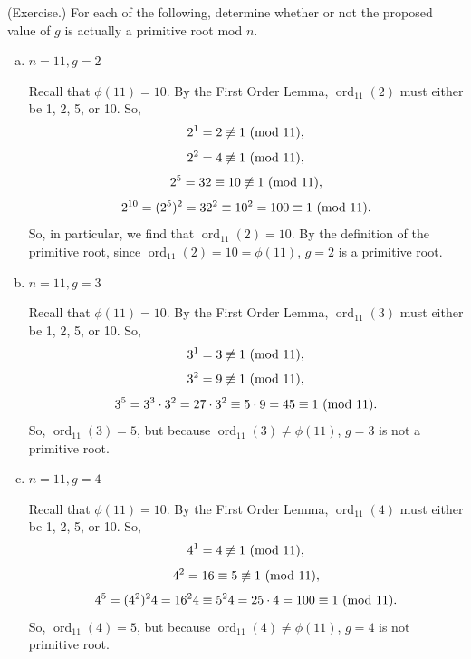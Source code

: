 \documentclass[letterpaper]{article}
\DeclareMathOperator{\ord}{ord}
\begin{document}
\begin{mdframed}
    (Exercise.) For each of the following, determine whether or not the proposed value of $g$ is actually a primitive root mod $n$. 
    \begin{enumerate}[(a)]
        \item $n = 11, g = 2$
        \begin{mdframed}
            Recall that $\phi(11) = 10$. By the First Order Lemma, $\ord_{11}(2)$ must either be 1, 2, 5, or 10. So, 
            \[2^1 = 2 \not\equiv 1 \ (\mathrm{mod}\ 11),\]
            \[2^2 = 4 \not\equiv 1 \ (\mathrm{mod}\ 11),\]
            \[2^5 = 32 \equiv 10 \not\equiv 1 \ (\mathrm{mod}\ 11),\]
            \[2^{10} = (2^5)^2 = 32^2 \equiv 10^2 = 100 \equiv 1 \ (\mathrm{mod}\ 11).\]
            So, in particular, we find that $\ord_{11}(2) = 10$. By the definition of the primitive root, since $\ord_{11}(2) = 10 = \phi(11)$, $g = 2$ is a primitive root. 
        \end{mdframed}
        \item $n = 11, g = 3$
        \begin{mdframed}
            Recall that $\phi(11) = 10$. By the First Order Lemma, $\ord_{11}(3)$ must either be 1, 2, 5, or 10. So, 
            \[3^1 = 3 \not\equiv 1 \ (\mathrm{mod}\ 11),\]
            \[3^2 = 9 \not\equiv 1 \ (\mathrm{mod}\ 11),\]
            \[3^5 = 3^3 \cdot 3^2 = 27 \cdot 3^2 \equiv 5 \cdot 9 = 45 \equiv 1 \ (\mathrm{mod}\ 11).\]
            So, $\ord_{11}(3) = 5$, but because $\ord_{11}(3) \neq \phi(11)$, $g = 3$ is not a primitive root.
        \end{mdframed}
        \item $n = 11, g = 4$
        \begin{mdframed}
            Recall that $\phi(11) = 10$. By the First Order Lemma, $\ord_{11}(4)$ must either be 1, 2, 5, or 10. So, 
            \[4^1 = 4 \not\equiv 1 \ (\mathrm{mod}\ 11),\]
            \[4^2 = 16 \equiv 5 \not\equiv 1 \ (\mathrm{mod}\ 11),\]
            \[4^5 = (4^2)^2 4 = 16^2 4 \equiv 5^2 4 = 25 \cdot 4 = 100 \equiv 1 \ (\mathrm{mod}\ 11).\]
            So, $\ord_{11}(4) = 5$, but because $\ord_{11}(4) \neq \phi(11)$, $g = 4$ is not primitive root.
        \end{mdframed}
    \end{enumerate}
\end{mdframed}
\end{document}
